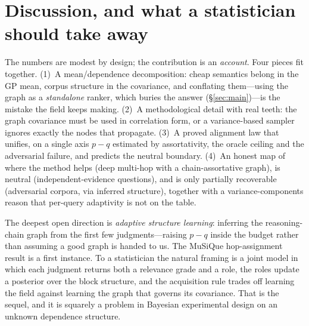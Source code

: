 \documentclass[11pt]{article}
\theoremstyle{plain}
\theoremstyle{definition}
\theoremstyle{remark}
\begin{document}
\section{Discussion, and what a statistician should take away}\label{sec:disc}
The numbers are modest by design; the contribution is an \emph{account}. Four pieces fit together. (1)~A
mean/dependence decomposition: cheap semantics belong in the GP mean, corpus structure in the covariance, and
conflating them---using the graph as a \emph{standalone} ranker, which buries the answer (\S\ref{sec:main})---is
the mistake the field keeps making. (2)~A methodological detail with
real teeth: the graph covariance must be used in correlation form, or a variance-based sampler ignores exactly the
nodes that propagate. (3)~A proved alignment law that unifies, on a single axis $p-q$ estimated by assortativity,
the oracle ceiling and the adversarial failure, and predicts the neutral boundary. (4)~An honest map of where the
method helps (deep multi-hop with a chain-assortative graph), is neutral (independent-evidence questions), and is
only partially recoverable (adversarial corpora, via inferred structure), together with a variance-components reason
that per-query adaptivity is not on the table.

The deepest open direction is \emph{adaptive structure learning}: inferring the reasoning-chain graph from the first
few judgments---raising $p-q$ inside the budget rather than assuming a good graph is handed to us. The MuSiQue
hop-assignment result is a first instance. To a statistician the natural framing is a joint model in which each
judgment returns both a relevance grade and a role, the roles update a posterior over the block structure, and the
acquisition rule trades off learning the field against learning the graph that governs its covariance. That is the
sequel, and it is squarely a problem in Bayesian experimental design on an unknown dependence structure.
\end{document}
